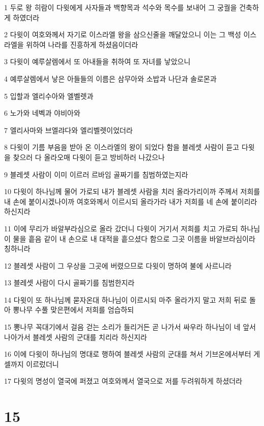 \par 1 두로 왕 히람이 다윗에게 사자들과 백향목과 석수와 목수를 보내어 그 궁궐을 건축하게 하였더라
\par 2 다윗이 여호와께서 자기로 이스라엘 왕을 삼으신줄을 깨달았으니 이는 그 백성 이스라엘을 위하여 나라를 진흥하게 하셨음이더라
\par 3 다윗이 예루살렘에서 또 아내들을 취하여 또 자녀를 낳았으니
\par 4 예루살렘에서 낳은 아들들의 이름은 삼무아와 소밥과 나단과 솔로몬과
\par 5 입할과 엘리수아와 엘벨렛과
\par 6 노가와 네벡과 야비아와
\par 7 엘리사마와 브엘랴다와 엘리벨렛이었더라
\par 8 다윗이 기름 부음을 받아 온 이스라엘의 왕이 되었다 함을 블레셋 사람이 듣고 다윗을 찾으러 다 올라오매 다윗이 듣고 방비하러 나갔으나
\par 9 블레셋 사람이 이미 이르러 르바임 골짜기를 침범하였는지라
\par 10 다윗이 하나님께 물어 가로되 내가 블레셋 사람을 치러 올라가리이까 주께서 저희를 내 손에 붙이시겠나이까 여호와께서 이르시되 올라가라 내가 저희를 네 손에 붙이리라 하신지라
\par 11 이에 무리가 바알부라심으로 올라 갔더니 다윗이 거기서 저희를 치고 가로되 하나님이 물을 흩음 같이 내 손으로 내 대적을 흩으셨다 함으로 그곳 이름을 바알브라심이라 칭하니라
\par 12 블레셋 사람이 그 우상을 그곳에 버렸으므로 다윗이 명하여 불에 사르니라
\par 13 블레셋 사람이 다시 골짜기를 침범한지라
\par 14 다윗이 또 하나님께 묻자온대 하나님이 이르시되 마주 올라가지 말고 저희 뒤로 돌아 뽕나무 수풀 맞은편에서 저희를 엄습하되
\par 15 뽕나무 꼭대기에서 걸음 걷는 소리가 들리거든 곧 나가서 싸우라 하나님이 네 앞서 나아가서 블레셋 사람의 군대를 치리라 하신지라
\par 16 이에 다윗이 하나님의 명대로 행하여 블레셋 사람의 군대를 쳐서 기브온에서부터 게셀까지 이르렀더니
\par 17 다윗의 명성이 열국에 퍼졌고 여호와께서 열국으로 저를 두려워하게 하셨더라

\chapter{15}

